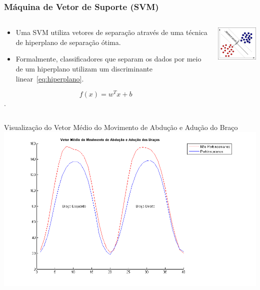 \documentclass{beamer}
\begin{document}
\begin{frame}
   \frametitle{Máquina de Vetor de Suporte (SVM)}
   \begin{block}{}
   
   \begin{columns}[c]
     \begin{column}{0.5\linewidth}
			 \begin{itemize}
				\item Uma SVM utiliza vetores de separação através de uma técnica de hiperplano de separação ótima.

				\item Formalmente, classificadores que separam os dados por meio de um hiperplano utilizam um discriminante linear~\ref{eq:hiperplano}.
			\end{itemize}

			\begin{equation}
			f(x)=w^Tx+b
			\label{eq:hiperplano}
			\end{equation}.
     \end{column}

     \begin{column}{0.5\linewidth}
				\includegraphics[width=4cm]{img/svmhyperplane.png}
    \end{column}
\end{columns}
\end{block}
\end{frame}

\begin{frame}{Visualização do Vetor Médio do Movimento de Abdução e Adução do Braço}
      \center \includegraphics[height=2.6 in]{img/vetormedioaducao.png}
\end{frame}
\end{document}
